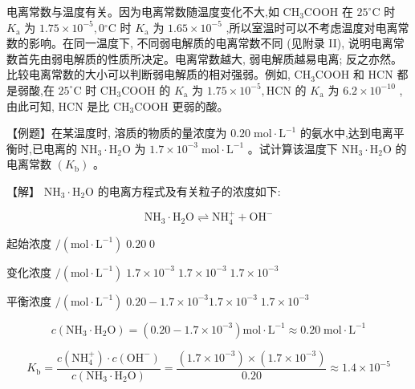 \documentclass[10pt]{article}
\begin{document}
电离常数与温度有关。因为电离常数随温度变化不大,如 \({\mathrm{{CH}}}_{3}\mathrm{{COOH}}\) 在 \({25}^{ \circ }\mathrm{C}\) 时 \({K}_{\mathrm{a}}\) 为 \({1.75} \times {10}^{-5},0{}^{ \circ }\mathrm{C}\) 时 \({K}_{\mathrm{a}}\) 为 \({1.65} \times {10}^{-5}\) ,所以室温时可以不考虑温度对电离常数的影响。在同一温度下, 不同弱电解质的电离常数不同 (见附录 II), 说明电离常数首先由弱电解质的性质所决定。电离常数越大, 弱电解质越易电离; 反之亦然。比较电离常数的大小可以判断弱电解质的相对强弱。例如, \({\mathrm{{CH}}}_{3}\mathrm{{COOH}}\) 和 \(\mathrm{{HCN}}\) 都是弱酸,在 \({25}^{ \circ }\mathrm{C}\) 时 \({\mathrm{{CH}}}_{3}\mathrm{{COOH}}\) 的 \({K}_{\mathrm{a}}\) 为 \({1.75} \times {10}^{-5},\mathrm{{HCN}}\) 的 \({K}_{\mathrm{a}}\) 为 \({6.2} \times {10}^{-{10}}\) ,由此可知, \(\mathrm{{HCN}}\) 是比 \({\mathrm{{CH}}}_{3}\mathrm{{COOH}}\) 更弱的酸。

【例题】在某温度时, 溶质的物质的量浓度为 \({0.20}\mathrm{\;{mol}} \cdot {\mathrm{L}}^{-1}\) 的氨水中,达到电离平衡时,已电离的 \({\mathrm{{NH}}}_{3} \cdot {\mathrm{H}}_{2}\mathrm{O}\) 为 \({1.7} \times {10}^{-3}\mathrm{\;{mol}} \cdot {\mathrm{L}}^{-1}\) 。试计算该温度下 \({\mathrm{{NH}}}_{3} \cdot {\mathrm{H}}_{2}\mathrm{O}\) 的电离常数 \(\left( {K}_{\mathrm{b}}\right)\) 。

【解】 \({\mathrm{{NH}}}_{3} \cdot {\mathrm{H}}_{2}\mathrm{O}\) 的电离方程式及有关粒子的浓度如下:

\[
{\mathrm{{NH}}}_{3} \cdot {\mathrm{H}}_{2}\mathrm{O} \rightleftharpoons {\mathrm{{NH}}}_{4}^{ + } + {\mathrm{{OH}}}^{ - }
\]

起始浓度 \(/\left( {\mathrm{{mol}} \cdot {\mathrm{L}}^{-1}}\right) \;{0.20}\;0\)

变化浓度 \(/\left( {\mathrm{{mol}} \cdot {\mathrm{L}}^{-1}}\right) \;{1.7} \times {10}^{-3}\;{1.7} \times {10}^{-3}\;{1.7} \times {10}^{-3}\)

平衡浓度 \(/\left( {\mathrm{{mol}} \cdot {\mathrm{L}}^{-1}}\right) \;{0.20} - {1.7} \times {10}^{-3}{1.7} \times {10}^{-3}\;{1.7} \times {10}^{-3}\)

\[
c\left( {{\mathrm{{NH}}}_{3} \cdot {\mathrm{H}}_{2}\mathrm{O}}\right) = \left( {{0.20} - {1.7} \times {10}^{-3}}\right) \mathrm{{mol}} \cdot {\mathrm{L}}^{-1} \approx {0.20}\mathrm{\;{mol}} \cdot {\mathrm{L}}^{-1}
\]

\[
{K}_{\mathrm{b}} = \frac{c\left( {\mathrm{{NH}}}_{4}^{ + }\right) \cdot c\left( {\mathrm{{OH}}}^{ - }\right) }{c\left( {{\mathrm{{NH}}}_{3} \cdot {\mathrm{H}}_{2}\mathrm{O}}\right) } = \frac{\left( {{1.7} \times {10}^{-3}}\right) \times \left( {{1.7} \times {10}^{-3}}\right) }{0.20} \approx {1.4} \times {10}^{-5}
\]
\end{document}
